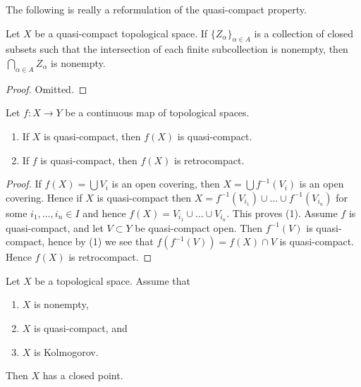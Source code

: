 \noindent
The following is really a reformulation of the
quasi-compact property.

\begin{lemma}
\label{lemma-intersection-closed-in-quasi-compact}
Let $X$ be a quasi-compact topological space.
If $\{Z_\alpha\}_{\alpha \in A}$ is a collection of closed subsets
such that the intersection of each finite subcollection
is nonempty, then $\bigcap_{\alpha \in A} Z_\alpha$ is nonempty.
\end{lemma}

\begin{proof}
Omitted.
\end{proof}

\begin{lemma}
\label{lemma-image-quasi-compact}
Let $f : X \to Y$ be a continuous map of topological spaces.
\begin{enumerate}
\item If $X$ is quasi-compact, then $f(X)$ is quasi-compact.
\item If $f$ is quasi-compact, then $f(X)$ is retrocompact.
\end{enumerate}
\end{lemma}

\begin{proof}
If $f(X) = \bigcup V_i$ is an open covering, then $X = \bigcup f^{-1}(V_i)$
is an open covering. Hence if $X$ is quasi-compact then
$X = f^{-1}(V_{i_1}) \cup \ldots \cup f^{-1}(V_{i_n})$ for some
$i_1, \ldots, i_n \in I$ and hence
$f(X) = V_{i_1} \cup \ldots \cup V_{i_n}$. This proves (1).
Assume $f$ is quasi-compact, and let $V \subset Y$ be quasi-compact open.
Then $f^{-1}(V)$ is quasi-compact, hence by (1) we see that
$f(f^{-1}(V)) = f(X) \cap V$ is quasi-compact. Hence $f(X)$
is retrocompact.
\end{proof}

\begin{lemma}
\label{lemma-quasi-compact-closed-point}
Let $X$ be a topological space. Assume that
\begin{enumerate}
\item $X$ is nonempty,
\item $X$ is quasi-compact, and
\item $X$ is Kolmogorov.
\end{enumerate}
Then $X$ has a closed point.
\end{lemma}

